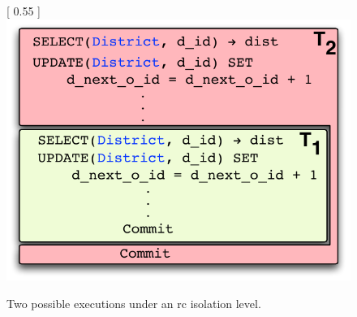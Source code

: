 \begin{figure}[!h]
\centering
{} [
  0.55\columnwidth
] {
  \includegraphics[scale=0.5]{Figures/motiv-eg-1-a}
}
\caption{Two possible executions under an {\sc rc} isolation level.}\label{fig:rc-ex}
\end{figure}

